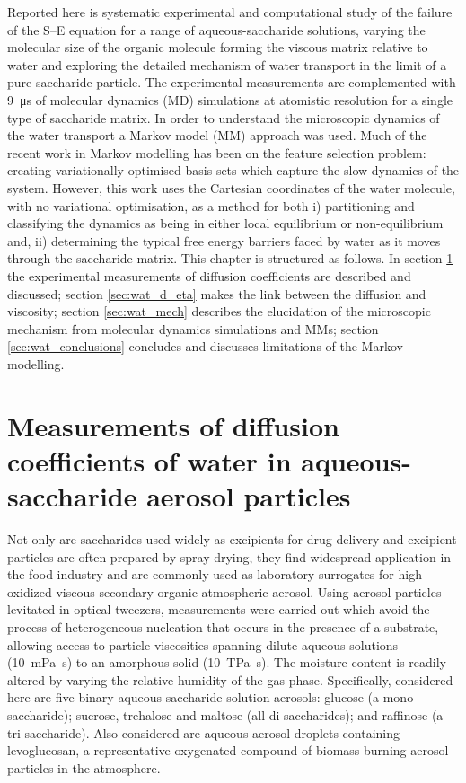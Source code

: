 Reported here is systematic experimental and computational study of the failure of the S–E equation for a range of aqueous-saccharide solutions, varying the molecular size of the organic molecule forming the viscous matrix relative to water and exploring the detailed mechanism of water transport in the limit of a pure saccharide particle. The experimental measurements are complemented with \SI{9}{\micro\second} of molecular dynamics (MD) simulations at atomistic resolution for a single type of saccharide matrix.  In order to understand the microscopic dynamics of the water transport a Markov model (MM) approach was used. Much of the recent work\cite{schererVariationalSelectionFeatures2019,husicMarkovStateModels2018} in Markov modelling has been on the feature selection problem: creating variationally optimised basis sets which capture the slow dynamics of the system. However, this work uses the Cartesian coordinates of the water molecule, with no variational optimisation, as a method for both i) partitioning and classifying the dynamics as being in either local equilibrium or non-equilibrium and, ii) determining the typical free energy barriers faced by water as it moves through the saccharide matrix. This chapter is structured as follows. In section \ref{sec:wat_d_coefs} the experimental measurements of diffusion coefficients are described and discussed; section \ref{sec:wat_d_eta} makes the link  between the diffusion and viscosity; section \ref{sec:wat_mech} describes the elucidation of the microscopic mechanism from molecular dynamics simulations and MMs; section \ref{sec:wat_conclusions} concludes and discusses limitations of the Markov modelling. 

\section{Measurements of diffusion coefficients of water in aqueous-saccharide aerosol particles}\label{sec:wat_d_coefs}

Not only are saccharides used widely as excipients for drug delivery\cite{Zhao2009,Sinha2001,Sastry2000} and excipient particles are often prepared by spray drying\cite{Andya1999,Vehring2008,Mosen2004}, they find widespread application in the food industry and are commonly used as laboratory surrogates for high oxidized viscous secondary organic atmospheric aerosol\cite{Koop2011,Bones2012,Liu2006,Zobrist2008,Reid2018,Song2016a}. Using aerosol particles levitated in optical tweezers, measurements were  carried out  which avoid the process of heterogeneous nucleation that occurs in the presence of a substrate, allowing access to particle viscosities spanning dilute aqueous solutions (\SI{10}{\milli\pascal\second}) to an amorphous solid (\SI{10}{\tera\pascal\second}). The moisture content is readily altered by varying the relative humidity of the gas phase. Specifically, considered here are five binary aqueous-saccharide solution aerosols: glucose (a mono-saccharide); sucrose, trehalose and maltose (all di-saccharides); and raffinose (a tri-saccharide). Also considered are aqueous aerosol droplets containing levoglucosan, a representative oxygenated compound of biomass burning aerosol particles in the atmosphere.\cite{Decesari2006}

